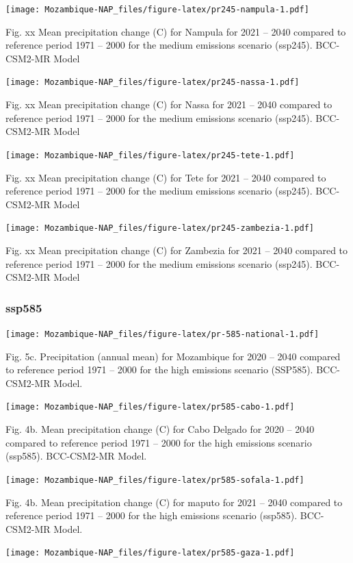 \documentclass[
]{book}
\begin{document}
\texttt{[image: Mozambique-NAP\_files/figure-latex/pr245-nampula-1.pdf]}

Fig. xx Mean precipitation change (C) for Nampula for 2021 -- 2040 compared to reference period 1971 -- 2000 for the medium emissions scenario (ssp245). BCC-CSM2-MR Model

\texttt{[image: Mozambique-NAP\_files/figure-latex/pr245-nassa-1.pdf]}

Fig. xx Mean precipitation change (C) for Nassa for 2021 -- 2040 compared to reference period 1971 -- 2000 for the medium emissions scenario (ssp245). BCC-CSM2-MR Model

\texttt{[image: Mozambique-NAP\_files/figure-latex/pr245-tete-1.pdf]}

Fig. xx Mean precipitation change (C) for Tete for 2021 -- 2040 compared to reference period 1971 -- 2000 for the medium emissions scenario (ssp245). BCC-CSM2-MR Model

\texttt{[image: Mozambique-NAP\_files/figure-latex/pr245-zambezia-1.pdf]}

Fig. xx Mean precipitation change (C) for Zambezia for 2021 -- 2040 compared to reference period 1971 -- 2000 for the medium emissions scenario (ssp245). BCC-CSM2-MR Model

\hypertarget{ssp585-1}{%
\subsubsection{ssp585}\label{ssp585-1}}

\texttt{[image: Mozambique-NAP\_files/figure-latex/pr-585-national-1.pdf]}

Fig. 5c. Precipitation (annual mean) for Mozambique for 2020 -- 2040 compared to reference period 1971 -- 2000 for the high emissions scenario (SSP585). BCC-CSM2-MR Model.

\texttt{[image: Mozambique-NAP\_files/figure-latex/pr585-cabo-1.pdf]}

Fig. 4b. Mean precipitation change (C) for Cabo Delgado for 2020 -- 2040 compared to reference period 1971 -- 2000 for the high emissions scenario (ssp585). BCC-CSM2-MR Model.

\texttt{[image: Mozambique-NAP\_files/figure-latex/pr585-sofala-1.pdf]}

Fig. 4b. Mean precipitation change (C) for maputo for 2021 -- 2040 compared to reference period 1971 -- 2000 for the high emissions scenario (ssp585). BCC-CSM2-MR Model.

\texttt{[image: Mozambique-NAP\_files/figure-latex/pr585-gaza-1.pdf]}
\end{document}

